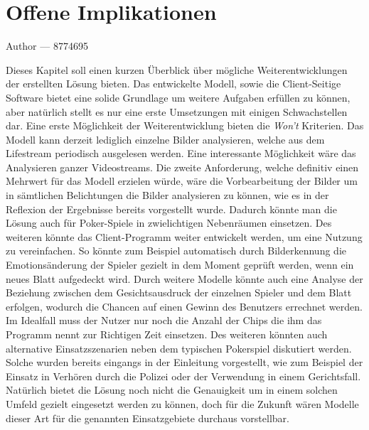 \documentclass[12pt, a4paper]{report}
\makeatletter
\newcommand{\sectionauthor}[1]{%
  {\parindent0pt\vspace*{-5pt}%
  \large{Author --- }
  \linespread{1.1}\large\scshape#1%
  \par\nobreak\vspace*{35pt} }
  \@afterheading%
}
\makeatother
\begin{document}
\section{Offene Implikationen}
\sectionauthor{8774695}
Dieses Kapitel soll einen kurzen Überblick über mögliche Weiterentwicklungen der erstellten Lösung bieten. Das entwickelte Modell, sowie die Client-Seitige Software bietet eine solide Grundlage um weitere Aufgaben erfüllen zu können, aber natürlich stellt es nur eine erste Umsetzungen mit einigen Schwachstellen dar.
Eine erste Möglichkeit der Weiterentwicklung bieten die \textit{Won't} Kriterien. Das Modell kann derzeit lediglich einzelne Bilder analysieren, welche aus dem Lifestream periodisch ausgelesen werden. Eine interessante Möglichkeit wäre das Analysieren ganzer Videostreams. Die zweite Anforderung, welche definitiv einen Mehrwert für das Modell erzielen würde, wäre die Vorbearbeitung der Bilder um in sämtlichen Belichtungen die Bilder analysieren zu können, wie es in der Reflexion der Ergebnisse bereits vorgestellt wurde. Dadurch könnte man die Lösung auch für Poker-Spiele in zwielichtigen Nebenräumen einsetzen.
\newline
Des weiteren könnte das Client-Programm weiter entwickelt werden, um eine Nutzung zu vereinfachen. So könnte zum Beispiel automatisch durch Bilderkennung die Emotionsänderung der Spieler gezielt in dem Moment geprüft werden, wenn ein neues Blatt aufgedeckt wird. Durch weitere Modelle könnte auch eine Analyse der Beziehung zwischen dem Gesichtsausdruck der einzelnen Spieler und dem Blatt erfolgen, wodurch die Chancen auf einen Gewinn des Benutzers errechnet werden. Im Idealfall muss der Nutzer nur noch die Anzahl der Chips die ihm das Programm nennt zur Richtigen Zeit einsetzen.
Des weiteren könnten auch alternative Einsatzszenarien neben dem typischen Pokerspiel diskutiert werden. Solche wurden bereits eingangs in der Einleitung vorgestellt, wie zum Beispiel der Einsatz in Verhören durch die Polizei oder der Verwendung in einem Gerichtsfall. Natürlich bietet die Lösung noch nicht die Genauigkeit um in einem solchen Umfeld gezielt eingesetzt werden zu können, doch für die Zukunft wären Modelle dieser Art für die genannten Einsatzgebiete durchaus vorstellbar. 
\end{document}
